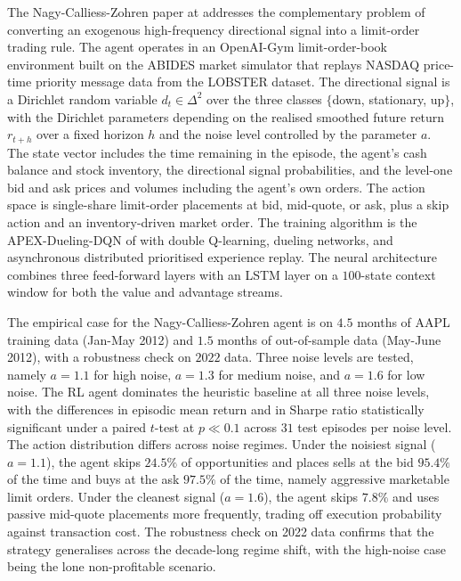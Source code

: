The Nagy-Calliess-Zohren paper at \citet{Briola2023} addresses the
complementary problem of converting an exogenous high-frequency directional
signal into a limit-order trading rule. The agent operates in an OpenAI-Gym
limit-order-book environment built on the ABIDES market simulator that
replays NASDAQ price-time priority message data from the LOBSTER dataset.
The directional signal is a Dirichlet random variable
$d_t \in \Delta^2$ over the three classes
$\{$down, stationary, up$\}$, with the Dirichlet parameters depending on the
realised smoothed future return $r_{t+h}$ over a fixed horizon $h$ and the
noise level controlled by the parameter $a$. The state vector includes the
time remaining in the episode, the agent's cash balance and stock inventory,
the directional signal probabilities, and the level-one bid and ask prices
and volumes including the agent's own orders. The action space is
single-share limit-order placements at bid, mid-quote, or ask, plus a skip
action and an inventory-driven market order. The training algorithm is the
APEX-Dueling-DQN of \citet{Horgan2018Apex} with double Q-learning, dueling
networks, and asynchronous distributed prioritised experience replay. The
neural architecture combines three feed-forward layers with an LSTM layer
on a $100$-state context window for both the value and advantage streams.

The empirical case for the Nagy-Calliess-Zohren agent is on $4.5$ months of
AAPL training data (Jan-May 2012) and $1.5$ months of out-of-sample data
(May-June 2012), with a robustness check on $2022$ data. Three noise levels
are tested, namely $a = 1.1$ for high noise, $a = 1.3$ for medium noise, and
$a = 1.6$ for low noise. The RL agent dominates the heuristic baseline at all
three noise levels, with the differences in episodic mean return and in
Sharpe ratio statistically significant under a paired $t$-test at $p \ll 0.1$
across $31$ test episodes per noise level. The action distribution differs
across noise regimes. Under the noisiest signal ($a = 1.1$), the agent
skips $24.5\%$ of opportunities and places sells at the bid $95.4\%$ of the
time and buys at the ask $97.5\%$ of the time, namely aggressive marketable
limit orders. Under the cleanest signal ($a = 1.6$), the agent skips $7.8\%$
and uses passive mid-quote placements more frequently, trading off execution
probability against transaction cost. The robustness check on 2022 data
confirms that the strategy generalises across the decade-long regime shift,
with the high-noise case being the lone non-profitable scenario.

